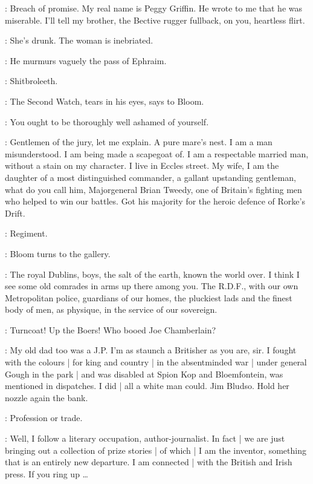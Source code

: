 \Martha:
Breach of promise.
My real name is Peggy Griffin.
He wrote to me that he was miserable.
I'll tell my brother,
the Bective rugger fullback,
on you,
heartless flirt.

\Bloom:
She's drunk.
The woman is inebriated.

:
He murmurs vaguely the pass of Ephraim.

\Bloom:
Shitbroleeth.

:
The Second Watch,
tears in his eyes,
says to Bloom.

\SecondWatch:
You ought to be thoroughly well ashamed of yourself.

\Bloom:
Gentlemen of the jury,
let me explain.
A pure mare's nest.
I am a man misunderstood.
I am being made a scapegoat of.
I am a respectable married man,
without a stain on my character.
I live in Eccles street.
My wife,
I am the daughter of a most distinguished commander,
a gallant upstanding gentleman,
what do you call him,
Majorgeneral Brian Tweedy,
one of Britain's fighting men who helped to win our battles.
Got his majority for the heroic defence of Rorke's Drift.

\FirstWatch:
Regiment.

:
Bloom turns to the gallery.

\Bloom:
The royal Dublins,
boys,
the salt of the earth,
known the world over.
I think I see some old comrades in arms up there among you.
The R.D.F.,
with our own Metropolitan police,
guardians of our homes,
the pluckiest lads and the finest body of men,
as physique,
in the service of our sovereign.

\Voice:
Turncoat!
Up the Boers!
Who booed Joe Chamberlain?

\Bloom:
My old dad too was a J.P.
I'm as staunch a Britisher as you are,
sir.
I fought with the colours |
for king and country |
in the absentminded war |
under general Gough in the park |
and was disabled at Spion Kop and Bloemfontein,
was mentioned in dispatches.
I did |
all a white man could.
Jim Bludso.
Hold her nozzle again the bank.

\FirstWatch:
Profession or trade.

\Bloom:
Well,
I follow a literary occupation,
author-journalist.
In fact |
we are just bringing out a collection of prize stories |
of which |
I am the inventor,
something that is an entirely new departure.
I am connected |
with the British and Irish press.
If you ring up \ldots

